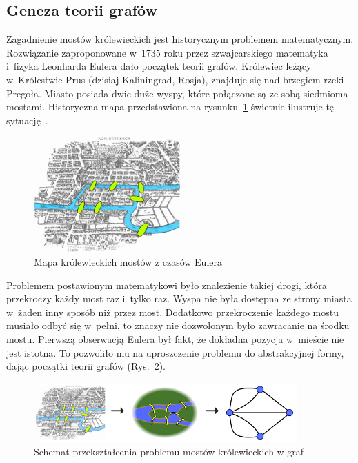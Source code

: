 \documentclass[twoside,12pt]{report}
\begin{document}
\subsection{Geneza teorii grafów}
Zagadnienie mostów królewieckich jest historycznym problemem matematycznym. Rozwiązanie zaproponowane w~1735 roku przez szwajcarskiego matematyka i~fizyka Leonharda Eulera dało początek teorii grafów. Królewiec leżący w~Królestwie Prus (dzisiaj Kaliningrad, Rosja), znajduje się nad brzegiem rzeki Pregoła. Miasto posiada dwie duże wyspy, które połączone są ze sobą siedmioma mostami. Historyczna mapa przedstawiona na rysunku~\ref{fig:mapa_krolewiec} świetnie ilustruje tę sytuację~\cite{teoria-grafow}.

\begin{figure}[htbp]
	\centering
	\includegraphics[width=0.50\textwidth]{img/konigsberg_bridges}
	\caption{Mapa królewieckich mostów z czasów Eulera} 
	\label{fig:mapa_krolewiec}
\end{figure}

Problemem postawionym matematykowi było znalezienie takiej drogi, która przekroczy każdy most raz i~tylko raz. Wyspa nie była dostępna ze strony miasta w~żaden inny sposób niż przez most. Dodatkowo przekroczenie każdego mostu musiało odbyć się w~pełni, to znaczy nie dozwolonym było zawracanie na środku mostu. Pierwszą obserwacją Eulera był fakt, że dokładna pozycja w~mieście nie jest istotna. To pozwoliło mu na uproszczenie problemu do abstrakcyjnej formy, dając początki teorii grafów (Rys.~\ref{fig:krolewiec_simple}).

\begin{figure}[htbp]
	\centering
	\includegraphics[width=0.90\textwidth]{img/bridge_uproszczenie}
	\caption{Schemat przekształcenia problemu mostów królewieckich w graf} 
	\label{fig:krolewiec_simple}
\end{figure}
\end{document}
